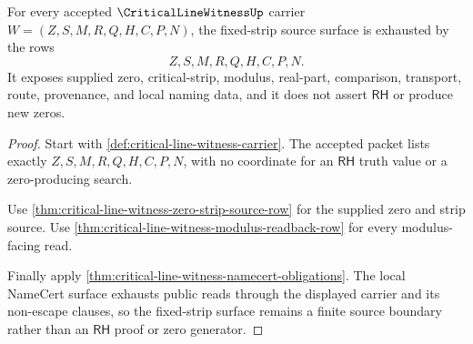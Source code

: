 \begin{theorem}
\label{thm:critical-line-witness-fixed-strip-scope-exhaustion}
For every accepted $\CriticalLineWitnessUp$ carrier $W=(Z,S,M,R,Q,H,C,P,N)$, the fixed-strip source surface is exhausted by the rows
$$
Z,S,M,R,Q,H,C,P,N.
$$
It exposes supplied zero, critical-strip, modulus, real-part, comparison, transport, route, provenance, and local naming data, and it does not assert $\mathsf{RH}$ or produce new zeros.
\end{theorem}
\begin{proof}
Start with \autoref{def:critical-line-witness-carrier}. The accepted packet lists exactly $Z,S,M,R,Q,H,C,P,N$, with no coordinate for an $\mathsf{RH}$ truth value or a zero-producing search.

Use \autoref{thm:critical-line-witness-zero-strip-source-row} for the supplied zero and strip source. Use \autoref{thm:critical-line-witness-modulus-readback-row} for every modulus-facing read.

Finally apply \autoref{thm:critical-line-witness-namecert-obligations}. The local NameCert surface exhausts public reads through the displayed carrier and its non-escape clauses, so the fixed-strip surface remains a finite source boundary rather than an $\mathsf{RH}$ proof or zero generator.
\end{proof}
